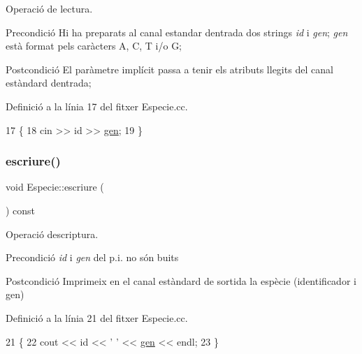 Operació de lectura. 

\begin{DoxyPrecond}{Precondició}
Hi ha preparats al canal estandar d\textquotesingle{}entrada dos strings {\itshape id} i {\itshape gen}; {\itshape gen} està format pels caràcters \textquotesingle{}A\textquotesingle{}, \textquotesingle{}C\textquotesingle{}, \textquotesingle{}T\textquotesingle{} i/o \textquotesingle{}G\textquotesingle{}; 
\end{DoxyPrecond}
\begin{DoxyPostcond}{Postcondició}
El paràmetre implícit passa a tenir els atributs llegits del canal estàndard d\textquotesingle{}entrada; 
\end{DoxyPostcond}


Definició a la línia 17 del fitxer Especie.\+cc.


\begin{DoxyCode}
17                      \{
18     cin >> \textcolor{keywordtype}{id} >> \hyperlink{class_especie_ac35bb565f7346cd6317b3a8c849456d1}{gen};
19 \}
\end{DoxyCode}
\mbox{\label{class_especie_ae24802ae0746b2560a48eea40f64760e}} 
\subsubsection{\texorpdfstring{escriure()}{escriure()}}
{\footnotesize\ttfamily void Especie\+::escriure (\begin{DoxyParamCaption}{ }\end{DoxyParamCaption}) const}



Operació d\textquotesingle{}escriptura. 

\begin{DoxyPrecond}{Precondició}
{\itshape id} i {\itshape gen} del p.\+i. no són buits 
\end{DoxyPrecond}
\begin{DoxyPostcond}{Postcondició}
Imprimeix en el canal estàndard de sortida la espècie (identificador i gen) 
\end{DoxyPostcond}


Definició a la línia 21 del fitxer Especie.\+cc.


\begin{DoxyCode}
21                              \{
22     cout << \textcolor{keywordtype}{id} << \textcolor{charliteral}{' '} << \hyperlink{class_especie_ac35bb565f7346cd6317b3a8c849456d1}{gen} << endl;
23 \}
\end{DoxyCode}


